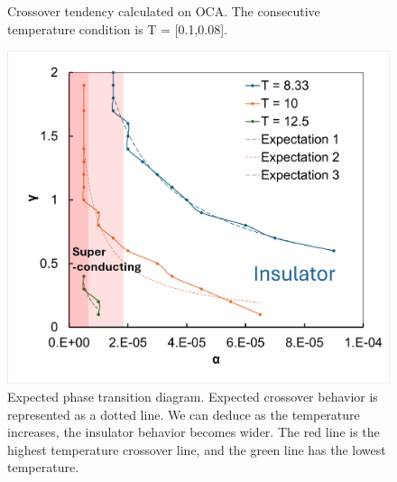 \documentclass{article}[12pt]
\begin{document}
\begin{spacing}{1.5}
\begin{figure}[H]
  \caption{Crossover tendency calculated on OCA. The consecutive temperature condition is T = [0.1,0.08].}
\end{figure}
\pagebreak
\newpage
\begin{figure}[H]
  \centerline{\includegraphics[width=12cm]{TexFigure/4_3_15_Expecregi.png}}
  \caption{Expected phase transition diagram. Expected crossover behavior is represented as a dotted line. 
   We can deduce as the temperature increases, the insulator behavior becomes wider. 
   The red line is the highest temperature crossover line, and the green line has the lowest temperature.}
  \end{figure}
\vfill


\pagebreak
\newpage

\end{spacing}
\end{document}
